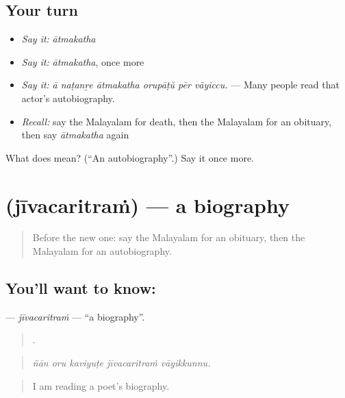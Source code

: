 \subsection*{Your turn}
\begin{itemize}
\raggedright
  \item \emph{Say it:} \emph{ātmakatha}
  \item \emph{Say it:} \emph{ātmakatha}, once more
  \item \emph{Say it:} \emph{ā naṭanṟe ātmakatha orupāṭŭ pēr vāyiccu.} — Many people read that actor's autobiography.
  \item \emph{Recall:} say the Malayalam for death, then the Malayalam for an obituary, then say \emph{ātmakatha} again
\end{itemize}

\begin{tcolorbox}[breakable,colback=teal!4,colframe=teal!35!black,title={Before you move on}]
What does  mean? (\textquotedblleft{}An autobiography\textquotedblright{}.) Say it once more.
\end{tcolorbox}
\section[\texorpdfstring{\ml{ജീവചരിത്രം} (jīvacaritraṁ)}{ജീവചരിത്രം (jīvacaritraṁ)}]{ (jīvacaritraṁ) — a biography}

\label{lesson:ML-C384-jivacaritram}



\begin{quote}
Before the new one: say the Malayalam for an obituary, then the Malayalam for an autobiography.
\end{quote}

\subsection*{You'll want to know: }
\textbf{} — \emph{jīvacaritraṁ} — \textquotedblleft{}a biography\textquotedblright{}.

\begin{quote}
    .
\end{quote}

\begin{quote}
\emph{ñān oru kaviyuṭe jīvacaritraṁ vāyikkunnu.}
\end{quote}

\begin{quote}
I am reading a poet's biography.
\end{quote}

